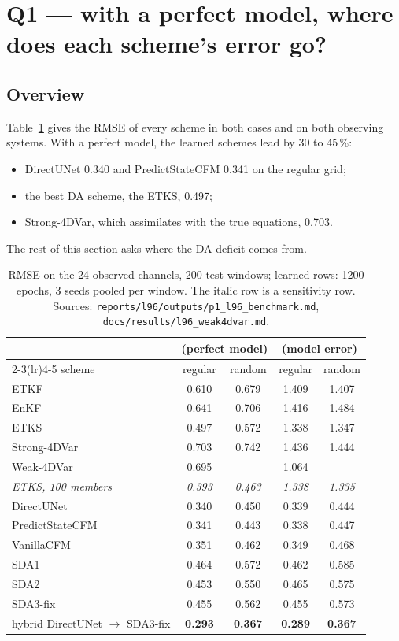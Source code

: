 \section{Q1 --- with a perfect model, where does each scheme's error go?}\label{sec:q1}

\subsection{Overview}
Table~\ref{tab:overview} gives the RMSE of every scheme in both cases and on both
observing systems. With a perfect model, the learned schemes lead by 30 to
45\,\%:
\begin{itemize}[leftmargin=*,nosep]
  \item DirectUNet 0.340 and PredictStateCFM 0.341 on the regular grid;
  \item the best DA scheme, the ETKS, 0.497;
  \item Strong-4DVar, which assimilates with the true equations, 0.703.
\end{itemize}
The rest of this section asks where the DA deficit comes from.

\begin{table}[t]
\centering\small
\caption{RMSE on the 24 observed channels, 200 test windows; learned rows: 1200 epochs, 3 seeds pooled per window. The italic row is a sensitivity row. Sources: \texttt{reports/l96/outputs/p1\_l96\_benchmark.md}, \texttt{docs/results/l96\_weak4dvar.md}.}
\label{tab:overview}
\begin{tabular}{lcccc}
\toprule
 & \multicolumn{2}{c}{\Sz{} (perfect model)} & \multicolumn{2}{c}{\So{} (model error)} \\
\cmidrule(lr){2-3}\cmidrule(lr){4-5}
scheme & regular & random & regular & random \\
\midrule
ETKF & 0.610 & 0.679 & 1.409 & 1.407 \\
EnKF & 0.641 & 0.706 & 1.416 & 1.484 \\
ETKS & 0.497 & 0.572 & 1.338 & 1.347 \\
Strong-4DVar & 0.703 & 0.742 & 1.436 & 1.444 \\
Weak-4DVar & 0.695 & \needsrun{} & 1.064 & \needsrun{} \\
\emph{ETKS, 100 members} & \emph{0.393} & \emph{0.463} & \emph{1.338} & \emph{1.335} \\
\midrule
DirectUNet & 0.340 & 0.450 & 0.339 & 0.444 \\
PredictStateCFM & 0.341 & 0.443 & 0.338 & 0.447 \\
VanillaCFM & 0.351 & 0.462 & 0.349 & 0.468 \\
SDA1 & 0.464 & 0.572 & 0.462 & 0.585 \\
SDA2 & 0.453 & 0.550 & 0.465 & 0.575 \\
SDA3-fix & 0.455 & 0.562 & 0.455 & 0.573 \\
hybrid DirectUNet $\to$ SDA3-fix & \textbf{0.293} & \textbf{0.367} & \textbf{0.289} & \textbf{0.367} \\
\bottomrule
\end{tabular}
\end{table}

